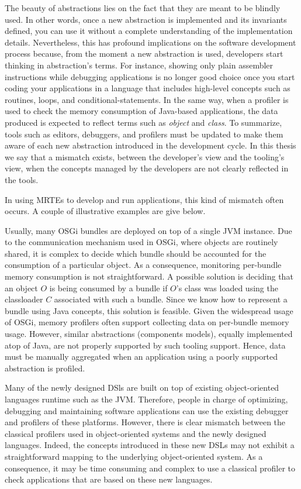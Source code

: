 The beauty of abstractions lies on the fact that they are meant to be blindly used.
In other words, once a new abstraction is implemented and its invariants defined, you can use it without a complete understanding of the implementation details.
Nevertheless, this has profound implications on the software development process because, from the moment a new abstraction is used, developers start thinking in abstraction's terms.
For instance, showing only plain assembler instructions while debugging applications is no longer good choice once you start coding your applications in a language that includes high-level concepts such as routines, loops, and conditional-statements.
In the same way, when a profiler is used to check the memory consumption of Java-based applications, the data produced is expected to reflect terms such as \textit{object} and \textit{class}.
To summarize, tools such as editors, debuggers, and profilers must be updated to make them aware of each new abstraction introduced in the development cycle.
In this thesis we say that a mismatch exists, between the developer's view and the tooling's view, when the concepts managed by the developers are not clearly reflected in the tools.

In using MRTEs to develop and run applications, this kind of mismatch often occurs.
A couple of illustrative examples are give below.

Usually, many OSGi bundles are deployed on top of a single JVM instance.
Due to the communication mechanism used in OSGi, where objects are routinely shared, it is complex to decide which bundle should be accounted for the consumption of a particular object.
As a consequence, monitoring per-bundle memory consumption is not straightforward. 
A possible solution is deciding that an object $O$ is being consumed by a bundle if $O$'s class was loaded using the classloader $C$ associated with such a bundle.
Since we know how to represent a bundle using Java concepts, this solution is feasible.
Given the widespread usage of OSGi, memory profilers often support collecting data on per-bundle memory usage.
However, similar abstractions (components models), equally implemented atop of Java, are not properly supported by such tooling support.
Hence, data must be manually aggregated when an application using a poorly supported abstraction is profiled.

Many of the newly designed DSls are built on top of existing object-oriented languages runtime such as the JVM. 
Therefore, people in charge of optimizing, debugging and maintaining software applications can use the existing debugger and profilers of these platforms. 
However, there is clear mismatch between the classical profilers used in object-oriented systems and the newly designed languages. 
Indeed, the concepts introduced in these new DSLs may not exhibit a straightforward mapping to the underlying object-oriented system.
As a consequence, it may be time consuming and complex to use a classical profiler to check applications that are based on these new languages.

